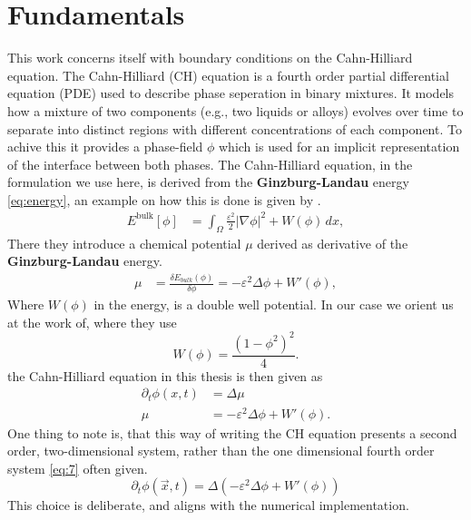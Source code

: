 \documentclass{mimosis}
\begin{document}
\chapter{Fundamentals}
\label{sec:orgae3a619}
This work concerns itself with boundary conditions on the Cahn-Hilliard equation. The Cahn-Hilliard (CH) equation is a fourth order partial differential equation (PDE) used to describe phase seperation in binary mixtures. It models how a mixture of two components (e.g., two liquids or alloys) evolves over time to separate into distinct regions with different concentrations of each component. To achive this it provides a phase-field \(\phi\) which is used for an implicit representation of the interface between both phases. The Cahn-Hilliard equation, in the formulation we use here, is derived from the \textbf{Ginzburg-Landau} energy \eqref{eq:energy}, an example on how this is done is given by \autocite{Wu_2022}.
\begin{align}
\label{eq:energy}
E^{\text{bulk}}[\phi] &= \int_{\Omega} \frac{\varepsilon^2}{2} |\nabla \phi |^2 + W(\phi) \, dx ,
\end{align}
There they introduce a chemical potential \(\mu\) derived as derivative of the \textbf{Ginzburg-Landau} energy.
\begin{align}
\label{eq:chemical-potential}
 \mu &= \frac{\delta E_{bulk}(\phi)}{\delta \phi} = -\varepsilon^2 \Delta \phi + W'(\phi),
\end{align}
Where \(W(\phi)\) in the energy, is a double well potential. In our case we orient us at the work of\autocite{SHIN20117441}, where they use
\begin{equation}
\label{eq:6}
W(\phi) = \frac{(1-\phi^2)^2}{4}.
\end{equation}
the Cahn-Hilliard equation in this thesis is then given as
\begin{equation}
\begin{aligned}
\partial_{t}\phi(x,t) &=  \Delta\mu \\
\mu &= - \varepsilon^2 \Delta\phi  + W'(\phi).
\end{aligned}
\end{equation}
One thing to note is, that this way of writing the CH equation presents a second order, two-dimensional system, rather than the one dimensional fourth order system \eqref{eq:7} often given.
\begin{equation}
\label{eq:7}
\partial_t \phi(\vec{x} , t) = \Delta(-\varepsilon^2  \Delta \phi + W\prime(\phi))
\end{equation}
This choice is deliberate, and aligns with the numerical implementation.
\end{document}
